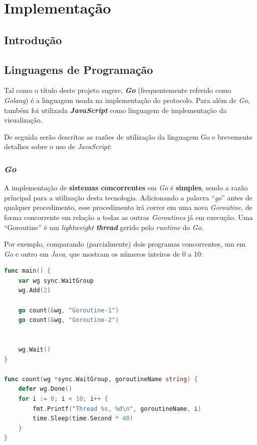 \chapter{Implementação}
\label{chap:imp}

\section{Introdução}
\label{chap4:sec:intro}

\section{Linguagens de Programação}
\label{chap3:linguagens}
Tal como o título deste projeto sugere, \textbf{\emph{Go}} (frequentemente referido como \emph{Golang}) é a linguagem usada na implementação do protocolo. Para além de \emph{Go}, também foi utilizada \textbf{\emph{JavaScript}} como linguagem de implementação da visualização.

De seguida serão descritas as razões de utilização da linguagem Go e brevemente detalhes sobre o uso de \emph{JavaScript}:



\subsection*{\emph{Go}}

A implementação de \textbf{sistemas concorrentes} em \emph{Go} é \textbf{simples}, sendo a razão príncipal para a utilização desta tecnologia. 
Adicionando a palavra ``\emph{go}'' antes de qualquer procedimento, esse procedimento irá correr em uma nova \emph{Goroutine}, de forma concorrente em relação a todas as outras \emph{Goroutines} já em execução.
Uma ``Goroutine'' é um \emph{lightweight \textbf{thread}} gerido pelo \emph{runtime} do \emph{Go}.




Por exemplo, comparando (parcialmente) dois programas concorrentes, um em \emph{Go} e outro em \emph{Java}, que mostram os números inteiros de 0 a 10:
\begin{lstlisting}[caption={Exemplo em \emph{Go}, usando a \emph{keyword} ``go'' para começar uma \emph{Goroutine}.},language=Go]
func main() {
	var wg sync.WaitGroup
	wg.Add(2)

	go count(&wg, "Goroutine-1")
	go count(&wg, "Goroutine-2")


	wg.Wait()
}

func count(wg *sync.WaitGroup, goroutineName string) {
	defer wg.Done()
	for i := 0; i < 10; i++ {
		fmt.Printf("Thread %s, %d\n", goroutineName, i)
		time.Sleep(time.Second * 40)
	}
}
\end{lstlisting}

